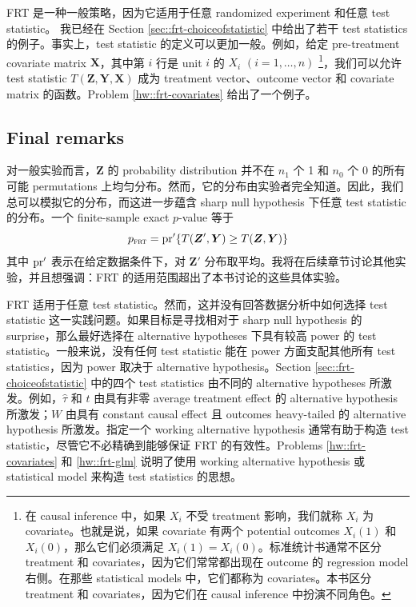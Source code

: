 FRT 是一种一般策略，因为它适用于任意 randomized experiment 和任意 test statistic。
我已经在 Section \ref{sec::frt-choiceofstatistic} 中给出了若干 test statistics 的例子。事实上，test statistic 的定义可以更加一般。例如，给定 pre-treatment covariate matrix $\boldsymbol{X}$，其中第 $i$ 行是 unit $i$ 的 $X_i$ $(i = 1, \ldots, n)$ \footnote{在 causal inference 中，如果 $X_i$ 不受 treatment 影响，我们就称 $X_i$ 为 covariate。也就是说，如果 covariate 有两个 potential outcomes $X_i(1)$ 和 $X_i(0)$，那么它们必须满足 $X_i(1) = X_i(0)$。标准统计书通常不区分 treatment 和 covariates，因为它们常常都出现在 outcome 的 regression model 右侧。在那些 statistical models 中，它们都称为 covariates。本书区分 treatment 和 covariates，因为它们在 causal inference 中扮演不同角色。}，我们可以允许 test statistic $T(\boldsymbol{Z}, \boldsymbol{Y}, \boldsymbol{X})$ 成为 treatment vector、outcome vector 和 covariate matrix 的函数。Problem \ref{hw::frt-covariates} 给出了一个例子。



\subsection{Final remarks}
对一般实验而言，$\boldsymbol{Z}$ 的 probability distribution 并不在 $n_1$ 个 1 和 $n_0$ 个 0 的所有可能 permutations 上均匀分布。然而，它的分布由实验者完全知道。因此，我们总可以模拟它的分布，而这进一步蕴含 sharp null hypothesis 下任意 test statistic 的分布。一个 finite-sample exact $p$-value 等于
$$
p_\textsc{frt} = \textup{pr}'\{  T(\boldsymbol{Z}', \boldsymbol{Y}) \geq T(\boldsymbol{Z}, \boldsymbol{Y}) \}
$$ 
其中 $\textup{pr}'$ 表示在给定数据条件下，对 $\boldsymbol{Z}'$ 分布取平均。我将在后续章节讨论其他实验，并且想强调：FRT 的适用范围超出了本书讨论的这些具体实验。

 
FRT 适用于任意 test statistic。然而，这并没有回答数据分析中如何选择 test statistic 这一实践问题。如果目标是寻找相对于 sharp null hypothesis 的 surprise，那么最好选择在 alternative hypotheses 下具有较高 power 的 test statistic。一般来说，没有任何 test statistic 能在 power 方面支配其他所有 test statistics，因为 power 取决于 alternative hypothesis。Section \ref{sec::frt-choiceofstatistic} 中的四个 test statistics 由不同的 alternative hypotheses 所激发。例如，$\hat{\tau}$ 和 $t$ 由具有非零 average treatment effect 的 alternative hypothesis 所激发；$W$ 由具有 constant causal effect 且 outcomes heavy-tailed 的 alternative hypothesis 所激发。指定一个 working alternative hypothesis 通常有助于构造 test statistic，尽管它不必精确到能够保证 FRT 的有效性。Problems \ref{hw::frt-covariates} 和 \ref{hw::frt-glm} 说明了使用 working alternative hypothesis 或 statistical model 来构造 test statistics 的思想。
 




